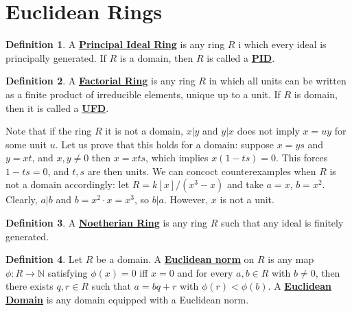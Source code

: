 \documentclass{article}
\theoremstyle{definition}
\theoremstyle{definition}
\theoremstyle{definition}
\theoremstyle{definition}
\theoremstyle{definition}
\newtheorem{definition}{Definition}[section]
\theoremstyle{definition}
\theoremstyle{definition}
\begin{document}
\section{Euclidean Rings}


\begin{tcolorbox}[colback=purple!5!white,colframe=purple!75!black]
\begin{definition}
    A \underline{\textbf{Principal Ideal Ring}} is any ring $R$ i which every ideal is principally generated. If $R$ is a domain, then $R$ is called a \underline{\textbf{PID}}. 
\end{definition}
\end{tcolorbox}


\begin{tcolorbox}[colback=purple!5!white,colframe=purple!75!black]
\begin{definition}
    A \underline{\textbf{Factorial Ring}}  is any ring $R$ in which all units can be written as a finite product of irreducible elements, unique up to a unit. If $R$ is domain, then it is called a \underline{\textbf{UFD}}. 
\end{definition}
\end{tcolorbox}
Note that if the ring $R$ it is not a domain, $x|y$ and $y|x$ does not imply $x=uy$ for some unit $u$. Let us prove that this holds for a domain: suppose $x=ys$ and $y=xt$, and $x,y\neq 0$ then $x=xts$, which implies $x(1-ts)=0$. This forces $1-ts=0$, and $t,s$ are then units. We can concoct counterexamples when $R$ is not a domain accordingly: let $R=k[x]/(x^3-x)$ and take $a=x$, $b=x^2$. Clearly, $a|b$ and $b=x^2\cdot x=x^3$, so $b|a$. However, $x$ is not a unit. 



\begin{tcolorbox}[colback=purple!5!white,colframe=purple!75!black]
\begin{definition}
    A \underline{\textbf{Noetherian Ring}} is any ring $R$ such that any ideal is finitely generated. 
\end{definition}
\end{tcolorbox}


\begin{tcolorbox}[colback=purple!5!white,colframe=purple!75!black]
\begin{definition}
    Let $R$ be a domain. A \underline{\textbf{Euclidean norm}} on $R$ is any map $\phi: R\to \mathbb N$ satisfying $\phi(x)=0 $ iff $x=0$ and for every $a,b\in R$ with $b\neq 0$, then there exists $q,r\in R$ such that $a=bq+r$ with $\phi(r)<\phi(b) $. A \underline{\textbf{Euclidean Domain}} is any domain equipped with a Euclidean norm.
\end{definition}
\end{tcolorbox}
\end{document}
